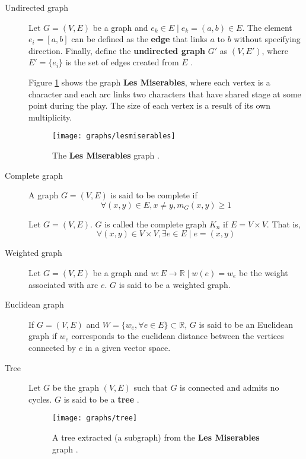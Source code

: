 \begin{description}
	\item[Undirected graph] Let $G=(V, E)$ be a graph and $e_k \in E \mid e_k=(a, b) \in E$. The element $e_i=[a, b]$ can be defined as the \textbf{edge} that links $a$ to $b$ without specifying direction. Finally, define the \textbf{undirected graph} $G'$ as $(V, E')$, where $E'=\{e_i\}$ is the set of edges created from $E$ \cite{berge1973}.

	Figure \ref{fig:graph} shows the graph \textbf{Les Miserables}, where each vertex is a character and each arc links two characters that have shared stage at some point during the play. The size of each vertex is a result of its own multiplicity.

	\begin{figure}[H]
		\centering
		\texttt{[image: graphs/lesmiserables]}
		\caption{The \textbf{Les Miserables} graph \protect\footnotemark.}
		\label{fig:graph}
	\end{figure}
	
	
	\item[Complete graph] A graph $G=(V, E)$ is said to be complete if
	$$\forall (x, y)\in E, x\ne y, m_G(x, y) \ge 1$$

	\begin{remark}
		Let $G=(V, E)$. $G$ is called the complete graph $K_n$ if $E = V \times V$. That is,
		$$\forall (x, y)\in V \times V, \exists e \in E \mid e=(x, y)$$
	\end{remark}

	\item[Weighted graph] Let $G=(V, E)$ be a graph and $w\colon E \to \mathbb{R} \mid w(e) = w_e$ be the weight associated with arc $e$. $G$ is said to be a weighted graph.

	\item[Euclidean graph] If $G=(V, E)$ and $W=\{w_e, \forall e\in E\}\subset \mathbb{R}$, $G$ is said to be an Euclidean graph if $w_e$ corresponds to the euclidean distance between the vertices connected by $e$ in a given vector space.

	\item[Tree] Let $G$ be the graph $(V, E)$ such that $G$ is connected and admits no cycles. $G$ is  said to be a \textbf{tree} \cite{berge1973}. 

	\begin{figure}[H]
		\centering
		\texttt{[image: graphs/tree]}
		\captionsetup{justification=centering}
		\caption{A tree extracted (a subgraph) from the \textbf{Les Miserables} graph \protect\footnotemark.}
		\label{tree}
	\end{figure}
	
\end{description}

